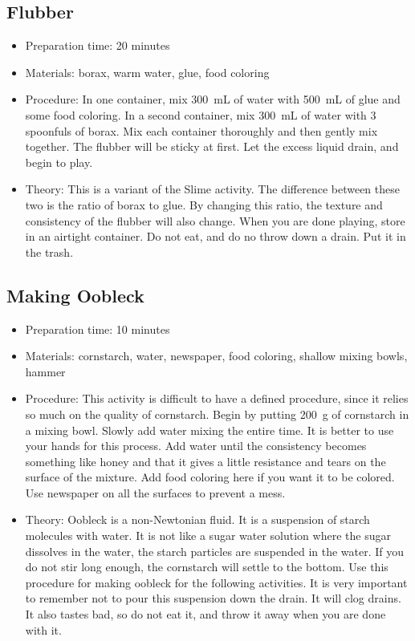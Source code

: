 \subsection{Flubber}
\begin{itemize}
\item{Preparation time: 20 minutes}
\item{Materials: borax, warm water, glue, food coloring}
\item{Procedure: In one container, mix 300~mL of water with 500~mL of glue and some food coloring. In a second container, mix 300~mL of water with 3 spoonfuls of borax. Mix each container thoroughly and then gently mix together. The flubber will be sticky at first. Let the excess liquid drain, and begin to play.}
\item{Theory: This is a variant of the Slime activity. The difference between these two is the ratio of borax to glue. By changing this ratio, the texture and consistency of the flubber will also change. When you are done playing, store in an airtight container. Do not eat, and do no throw down a drain. Put it in the trash.}
\end{itemize}

\subsection{Making Oobleck}
\begin{itemize}
\item{Preparation time: 10 minutes}
\item{Materials: cornstarch, water, newspaper, food coloring, shallow mixing bowls, hammer}
\item{Procedure: This activity is difficult to have a defined procedure, since it relies so much on the quality of cornstarch. Begin by putting 200~g of cornstarch in a mixing bowl. Slowly add water mixing the entire time. It is better to use your hands for this process. Add water until the consistency becomes something like honey and that it gives a little resistance and tears on the surface of the mixture. Add food coloring here if you want it to be colored. Use newspaper on all the surfaces to prevent a mess.}
\item{Theory: Oobleck is a non-Newtonian fluid. It is a suspension of starch molecules with water. It is not like a sugar water solution where the sugar dissolves in the water, the starch particles are suspended in the water. If you do not stir long enough, the cornstarch will settle to the bottom. Use this procedure for making oobleck for the following activities. It is very important to remember not to pour this suspension down the drain. It will clog drains. It also tastes bad, so do not eat it, and throw it away when you are done with it.}
\end{itemize}

